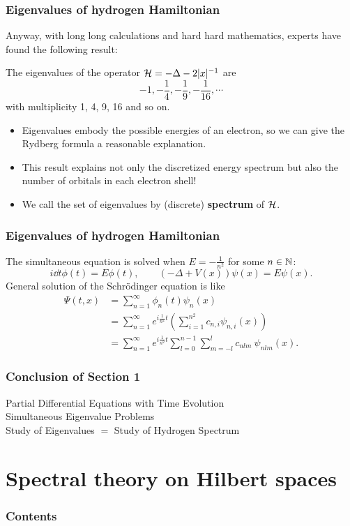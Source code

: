 \documentclass[10pt,handout]{beamer}
\begin{document}
\begin{frame}
\frametitle{Eigenvalues of hydrogen Hamiltonian}
  Anyway, with long long calculations and hard hard mathematics, experts have found the following result:
  \begin{prop}
    The eigenvalues of the operator $\mathcal{H}=-\Delta-2|x|^{-1}$ are \pause
    \[-1,-\frac14,-\frac19,-\frac1{16},\cdots\]
    \pause with multiplicity 1, 4, 9, 16 and so on.
  \end{prop}
  \begin{itemize}[<+->]
    \item Eigenvalues embody the possible energies of an electron, so we can give the Rydberg formula a reasonable explanation.
    \item This result explains not only the discretized energy spectrum but also the number of orbitals in each electron shell!
    \item We call the set of eigenvalues by (discrete) \textbf{spectrum} of $\mathcal{H}$.
  \end{itemize}
\end{frame}

\begin{frame}
\frametitle{Eigenvalues of hydrogen Hamiltonian}
  The simultaneous equation is solved when $E=-\frac1{n^2}$ for some $n\in\mathbb{N}$:
  \[i\dd{t}\phi(t)=E\phi(t),\qquad(-\Delta+V(x))\psi(x)=E\psi(x).\]
  \pause General solution of the Schr\"odinger equation is like
  \begin{align*}
    \Psi(t,x)&=\sum_{n=1}^\infty\phi_n(t)\psi_n(x)\\
    &=\sum_{n=1}^\infty e^{i\frac1{n^2}t}\left(\sum_{i=1}^{n^2}c_{n,i}\psi_{n,i}(x)\right)\\
    &=\sum_{n=1}^\infty e^{i\frac1{n^2}t}\sum_{l=0}^{n-1}\sum_{m=-l}^lc_{nlm}\ \psi_{nlm}(x).
  \end{align*}
\end{frame}

\begin{frame}
\frametitle{Conclusion of Section 1}
  \begin{rd}
  Partial Differential Equations with Time Evolution \\
  Simultaneous Eigenvalue Problems  \\
  Study of Eigenvalues $=$ Study of Hydrogen Spectrum
  \end{rd}
\end{frame}


\section{Spectral theory on Hilbert spaces}
\begin{frame}
\frametitle{Contents}
  \tableofcontents[currentsection]
\end{frame}
\end{document}
